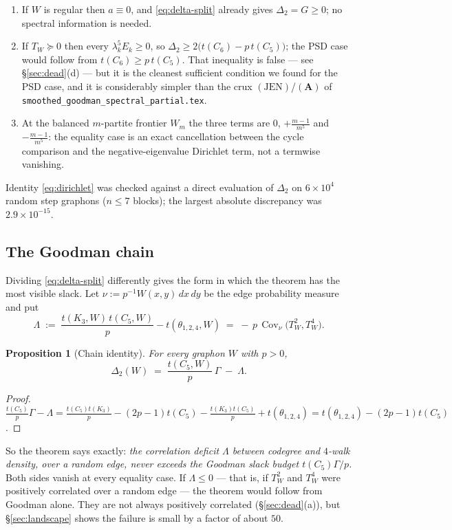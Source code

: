 \documentclass[11pt]{article}
\newtheorem{proposition}[theorem]{Proposition}
\theoremstyle{definition}
\newcommand{\Cov}{\operatorname{Cov}}
\newcommand{\tw}{T_W}
\newcommand{\thet}{\theta_{1,2,4}}
\begin{document}
\begin{enumerate}[leftmargin=1.6em]
\item If $W$ is regular then $a\equiv0$, and \eqref{eq:delta-split} already
gives $\Delta_2=G\ge0$; no spectral information is needed.
\item If $\tw\succeq0$ then every $\lambda_k^5E_k\ge0$, so
$\Delta_2\ge2\big(t(C_6)-p\,t(C_5)\big)$; the PSD case would follow from
$t(C_6)\ge p\,t(C_5)$.  That inequality is false --- see
\S\ref{sec:dead}(d) --- but it is the cleanest sufficient condition we found for
the PSD case, and it is considerably simpler than the crux
$(\mathrm{JEN})$/$(\mathbf A)$ of \texttt{smoothed\_goodman\_spectral\_partial.tex}.
\item At the balanced $m$-partite frontier $W_m$ the three terms are
$0$, $+\tfrac{m-1}{m^5}$ and $-\tfrac{m-1}{m^5}$: the equality case is an exact
cancellation between the cycle comparison and the negative-eigenvalue Dirichlet
term, not a termwise vanishing.
\end{enumerate}

Identity \eqref{eq:dirichlet} was checked against a direct evaluation of
$\Delta_2$ on $6\times10^4$ random step graphons ($n\le7$ blocks); the largest
absolute discrepancy was $2.9\times10^{-15}$.

\subsection{The Goodman chain}

Dividing \eqref{eq:delta-split} differently gives the form in which the theorem
has the most visible slack.  Let $\nu:=p^{-1}W(x,y)\,dx\,dy$ be the edge
probability measure and put
\[
  \Lambda\;:=\;\frac{t(K_3,W)\,t(C_5,W)}{p}-t(\thet,W)
  \;=\;-\,p\,\Cov_\nu\!\big(\tw^2,\tw^4\big).
\]

\begin{proposition}[Chain identity]\label{prop:chain}
For every graphon $W$ with $p>0$,
\begin{equation}\label{eq:chain}
  \Delta_2(W)\;=\;\frac{t(C_5,W)}{p}\,\Gamma\;-\;\Lambda .
\end{equation}
\end{proposition}

\begin{proof}
$\frac{t(C_5)}{p}\Gamma-\Lambda
=\frac{t(C_5)t(K_3)}{p}-(2p-1)t(C_5)-\frac{t(K_3)t(C_5)}{p}+t(\thet)
=t(\thet)-(2p-1)t(C_5)$.
\end{proof}

So the theorem says exactly: \emph{the correlation deficit $\Lambda$ between
codegree and $4$-walk density, over a random edge, never exceeds the Goodman
slack budget $t(C_5)\Gamma/p$.}  Both sides vanish at every equality case.  If
$\Lambda\le0$ --- that is, if $\tw^2$ and $\tw^4$ were positively correlated
over a random edge --- the theorem would follow from Goodman alone.  They are
not always positively correlated (\S\ref{sec:dead}(a)), but \S\ref{sec:landscape}
shows the failure is small by a factor of about $50$.
\end{document}
